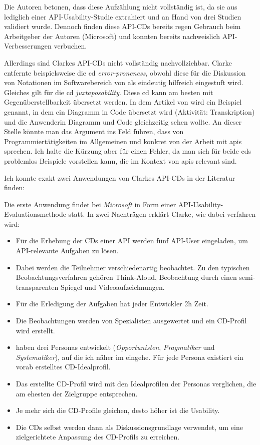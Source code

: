 \begin{important}
Die Autoren betonen, dass diese Aufzählung nicht vollständig ist, da sie aus lediglich einer API-Usability-Studie extrahiert und an Hand von drei Studien validiert wurde. Dennoch finden diese API-CDs bereits regen Gebrauch beim Arbeitgeber der Autoren (Microsoft) und konnten bereits nachweislich API-Verbesserungen verbuchen.

Allerdings sind Clarkes API-CDs nicht vollständig nachvollziehbar. Clarke entfernte beispielsweise die \acrshort{cd} \textit{error-proneness}, obwohl diese für die Diskussion von Notationen im Softwarebereich von \cite{Blackwell:1999vi} als eindeutig hilfreich eingestuft wird. Gleiches gilt für die \acrshort{cd} \textit{juxtaposability}. Diese \acrshort{cd} kann am besten mit Gegenüberstellbarkeit übersetzt werden. In dem Artikel von \cite{Blackwell:1999vi} wird ein Beispiel genannt, in dem ein Diagramm in Code übersetzt wird (Aktivität: Transkription) und die Anwenderin Diagramm und Code gleichzeitig sehen wollte. An dieser Stelle könnte man das Argument ins Feld führen, dass \cite{Blackwell:1999vi} von Programmiertätigkeiten im Allgemeinen und \cite{Anonymous:9HSMlhmF} konkret von der Arbeit mit \acrshort{api}s sprechen. Ich halte die Kürzung aber für einen Fehler, da man sich für beide \acrshort{cd}s problemlos Beispiele vorstellen kann, die im Kontext von \acrshort{api}s relevant sind.

Ich konnte exakt zwei Anwendungen von Clarkes API-CDs in der Literatur finden:

Die erste Anwendung findet bei \textit{Microsoft} in Form einer API-Usability-Evaluationsmethode statt. In zwei Nachträgen \citep{Clarke:2003wk,clarke:2006} erklärt Clarke, wie dabei verfahren wird:
\begin{itemize}
\item Für die Erhebung der CDs einer API werden fünf API-User eingeladen, um API-relevante Aufgaben zu lösen.
\item Dabei werden die Teilnehmer verschiedenartig beobachtet. Zu den typischen Beobachtungsverfahren gehören Think-Aloud, Beobachtung durch einen semi-transparenten Spiegel und Videoaufzeichnungen.
\item Für die Erledigung der Aufgaben hat jeder Entwickler 2h Zeit.
\item Die Beobachtungen werden von Spezialisten ausgewertet und ein CD-Profil wird erstellt.
\item \cite{Stylos:2007jb} haben drei Personas entwickelt (\textit{Opportunisten}, \textit{Pragmatiker} und \textit{Systematiker}), auf die ich näher im  eingehe. Für jede Persona existiert ein vorab erstelltes CD-Idealprofil.
\item Das erstellte CD-Profil wird mit den Idealprofilen der Personas verglichen, die am ehesten der Zielgruppe entsprechen.
\item Je mehr sich die CD-Profile gleichen, desto höher ist die Usability.
\item Die CDs selbst werden dann als Diskussionsgrundlage verwendet, um eine zielgerichtete Anpassung des CD-Profils zu erreichen.
\end{itemize}


\end{important}
